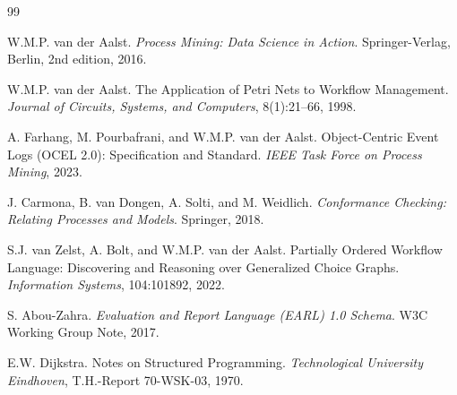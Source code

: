 \documentclass[11pt,a4paper,oneside]{book}
\theoremstyle{definition}
\begin{document}
\begin{thebibliography}{99}

W.M.P. van der Aalst.
\newblock \emph{Process Mining: Data Science in Action}.
\newblock Springer-Verlag, Berlin, 2nd edition, 2016.

W.M.P. van der Aalst.
\newblock The Application of Petri Nets to Workflow Management.
\newblock \emph{Journal of Circuits, Systems, and Computers}, 8(1):21--66, 1998.

A. Farhang, M. Pourbafrani, and W.M.P. van der Aalst.
\newblock Object-Centric Event Logs (OCEL 2.0): Specification and Standard.
\newblock \emph{IEEE Task Force on Process Mining}, 2023.

J. Carmona, B. van Dongen, A. Solti, and M. Weidlich.
\newblock \emph{Conformance Checking: Relating Processes and Models}.
\newblock Springer, 2018.

S.J. van Zelst, A. Bolt, and W.M.P. van der Aalst.
\newblock Partially Ordered Workflow Language: Discovering and Reasoning over Generalized Choice Graphs.
\newblock \emph{Information Systems}, 104:101892, 2022.

S. Abou-Zahra.
\newblock \emph{Evaluation and Report Language (EARL) 1.0 Schema}.
\newblock W3C Working Group Note, 2017.

E.W. Dijkstra.
\newblock Notes on Structured Programming.
\newblock \emph{Technological University Eindhoven}, T.H.-Report 70-WSK-03, 1970.

\end{thebibliography}
\end{document}
